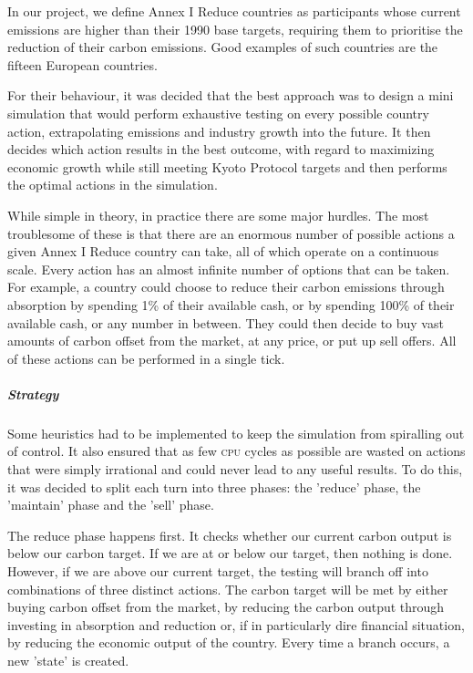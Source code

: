 In our project, we define Annex I Reduce countries as participants whose current emissions are higher than their 1990 base targets, requiring them to prioritise the reduction of their carbon emissions. Good examples of such countries are the fifteen European countries.

For their behaviour, it was decided that the best approach was to design a mini simulation that would perform exhaustive testing on every possible country action, extrapolating emissions and industry growth into the future. It then decides which action results in the best outcome, with regard to maximizing economic growth while still meeting Kyoto Protocol targets and then performs the optimal actions in the simulation.

While simple in theory, in practice there are some major hurdles. The most troublesome of these is that there are an enormous number of possible actions a given Annex I Reduce country can take, all of which operate on a continuous scale. Every action has an almost infinite number of options that can be taken. For example, a country could choose to reduce their carbon emissions through absorption by spending 1\% of their available cash, or by spending 100\% of their available cash, or any number in between. They could then decide to buy vast amounts of carbon offset from the market, at any price, or put up sell offers. All of these actions can be performed in a single tick.

\subparagraph{Strategy}

Some heuristics had to be implemented to keep the simulation from spiralling out of control. It also ensured that as few \textsc{cpu} cycles as possible are wasted on actions that were simply irrational and could never lead to any useful results. To do this, it was decided to split each turn into three phases: the 'reduce' phase, the 'maintain' phase and the 'sell' phase.

The reduce phase happens first. It checks whether our current carbon output is below our carbon target. If we are at or below our target, then nothing is done. However, if we are above our current target, the testing will branch off into combinations of three distinct actions. The carbon target will be met by either buying carbon offset from the market, by reducing the carbon output through investing in absorption and reduction or, if in particularly dire financial situation, by reducing the economic output of the country. Every time a branch occurs, a new 'state' is created.

